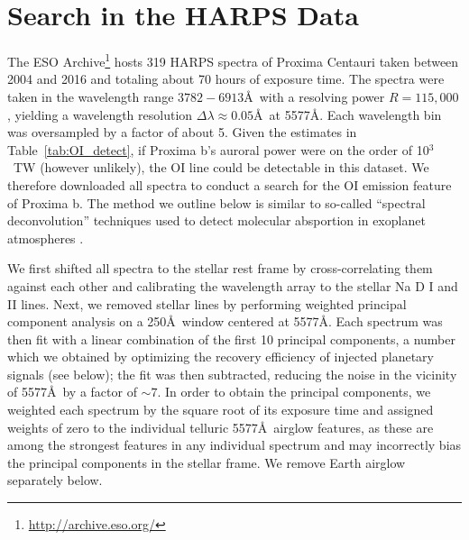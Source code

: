 \documentclass{emulateapj}
\begin{document}
\section{Search in the HARPS Data}
\label{sec:search}

The ESO Archive\footnote{\url{http://archive.eso.org/}} hosts 319 HARPS spectra of Proxima Centauri taken between 2004 and 2016 and totaling about 70 hours of exposure time. The spectra were taken in the wavelength range $3782-6913$\AA\ with a resolving power $R = 115,000$, yielding a wavelength resolution $\Delta\lambda \approx 0.05$\AA\ at 5577\AA. Each wavelength bin was oversampled by a factor of about 5. Given the estimates in Table~\ref{tab:OI_detect}, if Proxima b's auroral power were on the order of 10$^{3}$~TW (however unlikely), the OI line could be detectable in this dataset. We therefore downloaded all spectra to conduct a search for the OI emission feature of Proxima b. The method we outline below is similar to so-called ``spectral deconvolution'' techniques used to detect molecular absportion in exoplanet atmospheres \citep[e.g.,][]{SparksFord2002,RiaudSchneider2007,Kawahara2014,Snellen2015}.

We first shifted all spectra to the stellar rest frame by cross-correlating them against each other and calibrating the wavelength array to the stellar Na D I and II lines. Next, we removed stellar lines by performing weighted principal component analysis \citep[WPCA;][]{Delchambre2015} on a 250\AA\ window centered at 5577\AA. Each spectrum was then fit with a linear combination of the first 10 principal components, a number which we obtained by optimizing the recovery efficiency of injected planetary signals (see below); the fit was then subtracted, reducing the noise in the vicinity of 5577\AA\ by a factor of ${\sim} 7$. In order to obtain the principal components, we weighted each spectrum by the square root of its exposure time and assigned weights of zero to the individual telluric 5577\AA\ airglow features, as these are among the strongest features in any individual spectrum and may incorrectly bias the principal components in the stellar frame. We remove Earth airglow separately below.
\end{document}
